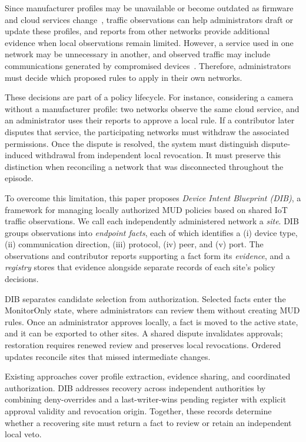 \documentclass[journal]{IEEEtran}
\theoremstyle{definition}
\begin{document}
Since manufacturer profiles may be unavailable or become outdated as firmware and cloud services change~\cite{hernandezramos2021mudreview,allowlistvariability}, traffic observations can help administrators draft or update these profiles, and reports from other networks provide additional evidence when local observations remain limited. However, a service used in one network may be unnecessary in another, and observed traffic may include communications generated by compromised devices~\cite{allowlistvariability,mirai}. Therefore, administrators must decide which proposed rules to apply in their own networks.

These decisions are part of a policy lifecycle. For instance, considering a camera without a manufacturer profile: two networks observe the same cloud service, and an administrator uses their reports to approve a local rule. If a contributor later disputes that service, the participating networks must withdraw the associated permissions. Once the dispute is resolved, the system must distinguish dispute-induced withdrawal from independent local revocation. It must preserve this distinction when reconciling a network that was disconnected throughout the episode.

To overcome this limitation, this paper proposes \emph{Device Intent Blueprint (DIB)}, a framework for managing locally authorized MUD policies based on shared IoT traffic observations. We call each independently administered network a \emph{site}. DIB groups observations into \emph{endpoint facts}, each of which identifies a (i) device type, (ii) communication direction, (iii) protocol, (iv) peer, and (v) port. The observations and contributor reports supporting a fact form its \emph{evidence}, and a \emph{registry} stores that evidence alongside separate records of each site's policy decisions.

DIB separates candidate selection from authorization. Selected facts enter the MonitorOnly state, where administrators can review them without creating MUD rules.
Once an administrator approves locally, a fact is moved to the active state, and it can be exported to other sites. A shared dispute invalidates approvals; restoration requires renewed review and preserves local revocations. Ordered updates reconcile sites that missed intermediate changes.

Existing approaches cover profile extraction, evidence sharing, and coordinated authorization. DIB addresses recovery across independent authorities by combining deny-overrides and a last-writer-wins pending register with explicit approval validity and revocation origin. Together, these records determine whether a recovering site must return a fact to review or retain an independent local veto.
\end{document}

